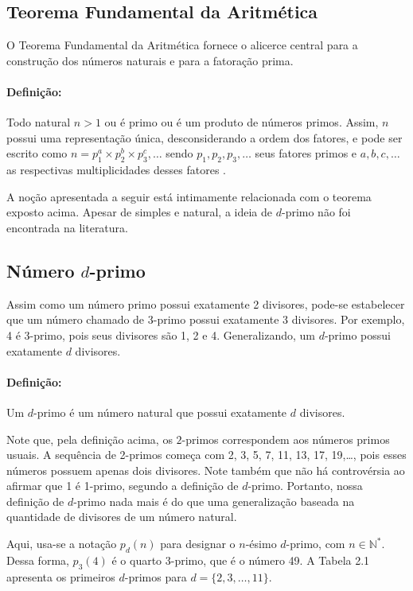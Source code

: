 \documentclass[12pt,a4paper,fleqn]{report}
\begin{document}
\subsection{Teorema Fundamental da Aritmética}

O Teorema Fundamental da Aritmética fornece o alicerce central para a construção dos números naturais e para a fatoração prima.

\paragraph*{Definição:} Todo natural $n > 1$ ou é primo ou é um produto
de números primos. Assim, $n$ possui uma representação única, desconsiderando a ordem
dos fatores, e pode ser escrito como $n = p_1 ^a\times p_2 ^b\times p_3^c,\ldots$ sendo 
$p_1, p_2, p_3,\ldots$ seus fatores primos e $a, b, c, \ldots$ as respectivas multiplicidades desses fatores \cite{ten}. 

A noção apresentada a seguir está intimamente relacionada com o teorema exposto acima. Apesar de simples e natural, a ideia de $d$-primo não foi encontrada na literatura.


\subsection{Número $d$-primo}

Assim como um número primo possui exatamente 2 divisores, pode-se estabelecer que um número chamado de
$3$-primo possui exatamente 3 divisores. Por exemplo, 4 é 3-primo, pois seus divisores
são 1, 2 e 4. Generalizando, um $d$-primo possui exatamente $d$ divisores.

\paragraph*{Definição:} Um $d$-primo é um número natural  que possui exatamente
$d$ divisores.

Note que, pela definição acima, os $2$-primos correspondem aos números primos usuais. A sequência de 2-primos começa com 2, 3, 5, 7, 11, 13, 17, 19,\ldots, pois esses números possuem apenas dois divisores.
Note também que não há controvérsia ao afirmar que 1 é 1-primo, segundo 
a definição de $d$-primo.
Portanto, nossa definição de $d$-primo nada mais é do que uma generalização baseada na quantidade de divisores de um número natural.

Aqui, usa-se a notação $p_d(n)$ para designar o $n$-ésimo $d$-primo, com $n \in \mathbb{N}^*$.
Dessa forma, $p_3(4)$ é o quarto 3-primo, que é o número 49. A Tabela 2.1 
apresenta os primeiros $d$-primos para $d=\{2, 3, \ldots, 11\}$. 
\end{document}
